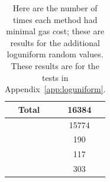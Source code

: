 \begin{table}[H]
\centering
\begin{tabular}{|c|S[table-format=5.0]|}
\hline
Total & 16384 \\
\hline
{} \UnrolledThree{} &  15774 \\
                      \WhileOne{}      &                         190 \\
                      \WhileTwo{}      &                         117 \\
                      \WhileThree{}    &                         303 \\
\hline
\end{tabular}
\caption[Minimal Gas Costs Statistics]{Here are the number of times
    each method had minimal gas cost;
    these are results for the additional loguniform random values.
    These results are for the tests in Appendix~\ref{app:loguniform}.
    }
\label{table:minimal_gas_costs_er}
\end{table}
